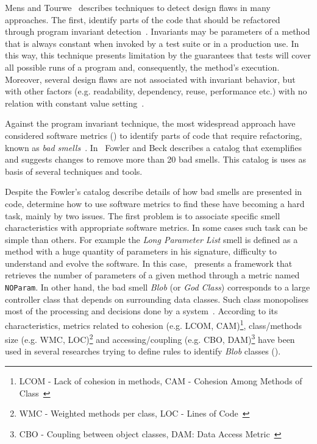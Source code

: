 \documentclass[conference]{IEEEtran}
\begin{document}
Mens and Tourwe~\cite{Mens2004b} describes techniques to 
detect design flaws in many approaches. The first, identify parts of the 
code that should be refactored through program invariant 
detection~\cite{KataokaEGN01}. Invariants may be parameters of a method that is 
always constant when invoked by a test suite or in a production use. In this 
way, this technique presents limitation by the guarantees that tests will cover 
all possible runs of a program and, consequently, the method's execution. 
Moreover, several design flaws are not associated with invariant behavior, but 
with other factors (e.g. readability, dependency, reuse, performance 
etc.) with no relation with constant value setting~\cite{kim2012field}.

Against the program invariant technique, the most widespread approach have considered 
software metrics (\cite{chidamber1994metrics,Gueheneuc:2004}) to identify parts 
of code that require refactoring, known as \textit{bad 
smells}~\cite{FowlerMartin2002}. In~\cite{FowlerMartin2002} Fowler and Beck 
describes a catalog that exemplifies and suggests changes to remove more than 20 
bad smells. This catalog is uses as basis of several techniques and tools.

Despite the Fowler's catalog describe details of how bad smells are presented 
in code, determine how to use software metrics to find these have becoming a 
hard task, mainly by two issues. The first problem is to associate 
specific smell characteristics with appropriate software metrics. In some cases 
such task can be simple than others. For example the \textit{Long Parameter 
List} smell is defined as a method with a huge quantity of parameters in his 
signature, difficulty to understand and evolve the software. In this 
case,~\cite{Gueheneuc:2004} presents a framework that retrieves the number of 
parameters of a given method through a metric named \texttt{NOParam}. In other 
hand, the bad smell \textit{Blob} (or \textit{God Class}) corresponds to a 
large controller class that depends on surrounding data classes. Such class 
monopolises most of the processing and decisions done by a 
system~\cite{Moha2010c}. According to its characteristics, metrics related to 
cohesion (e.g. LCOM, CAM)\footnote{LCOM - Lack of cohesion in methods, CAM -  
Cohesion Among Methods of Class~\cite{chidamber1994metrics}}, class/methods 
size (e.g. WMC, LOC)\footnote{WMC - Weighted methods per class, LOC - Lines of 
Code~\cite{chidamber1994metrics}} and accessing/coupling (e.g. CBO, 
DAM)\footnote{CBO - Coupling between object classes, DAM: Data Access 
Metric~\cite{chidamber1994metrics}} have been used in several researches trying 
to define rules to identify \textit{Blob} classes 
(\cite{Marinescu2001c,Moha2010c,Ouni2012f}).
\end{document}
